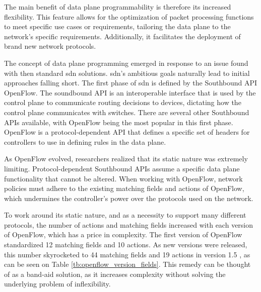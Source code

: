 The main benefit of data plane programmability is therefore its increased flexibility\cite{bifulco_survey_2018}. This feature allows for the optimization of packet processing functions to meet specific use cases or requirements, tailoring the data plane to the network's specific requirements. Additionally, it facilitates the deployment of brand new network protocols. 

The concept of data plane programming emerged in response to an issue found with then standard \gls{sdn} solutions. \gls{sdn}'s ambitious goals naturally lead to initial approaches falling short. The first phase of \gls{sdn} is defined by the Southbound API OpenFlow. The soundbound API is an interoperable interface that is used by the control plane to communicate routing decisions to devices, dictating how the control plane communicates with switches\cite{li_protocol_2017}. There are several other Southbound APIs available, with OpenFlow being the most popular in this first phase. OpenFlow is a protocol-dependent API that defines a specific set of headers for controllers to use in defining rules in the data plane. 

As OpenFlow evolved, researchers realized that its static nature was extremely limiting\cite{bosshart_p4_2014}\cite{hauser_survey_2021}\cite{li_protocol_2017}. Protocol-dependent Southbound APIs assume a specific data plane functionality that cannot be altered. When working with OpenFlow, network policies must adhere to the existing matching fields and actions of OpenFlow, which undermines the controller's power over the protocols used on the network.  

To work around its static nature, and as a necessity to support many different protocols, the number of actions and matching fields increased with each version of OpenFlow, which has a price in complexity. The first version of OpenFlow standardized 12 matching fields and 10 actions. As new versions were released, this number skyrocketed to 44 matching fields and 19 actions in version 1.5 \cite{li_protocol_2017}\cite{bosshart_p4_2014}, as can be seen on Table \ref{tb:openflow_version_fields}. This remedy can be thought of as a band-aid solution, as it increases complexity without solving the underlying problem of inflexibility.


